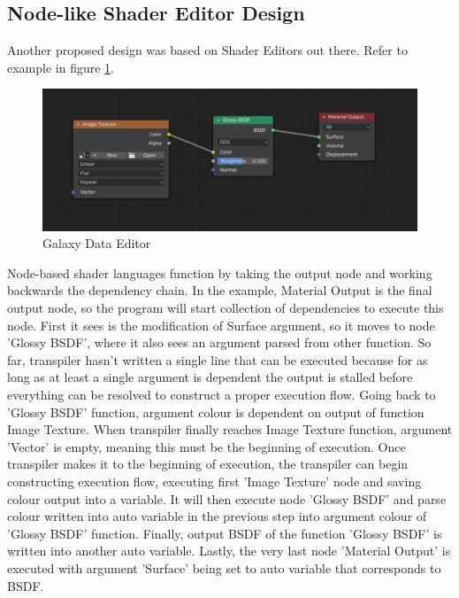 \documentclass{article}
\begin{document}
\subsection{Node-like Shader Editor Design}
Another proposed design was based on Shader Editors out there. Refer to example in figure \ref{fig:blendershader}. 
\begin{figure}[H]
    \centering
    \includegraphics[width=1\textwidth]{blendershaderNE.png}
    \caption{Galaxy Data Editor}
    \label{fig:blendershader}
\end{figure}
Node-based shader languages function by taking the output node and working backwards the dependency chain. In the example, Material Output is the final output node, so the program will start collection of dependencies to execute this node. First it sees is the modification of Surface argument, so it moves to node 'Glossy BSDF', where it also sees an argument parsed from other function. So far, transpiler hasn't written a single line that can be executed because for as long as at least a single argument is dependent the output is stalled before everything can be resolved to construct a proper execution flow. Going back to 'Glossy BSDF' function, argument colour is dependent on output of function Image Texture. When transpiler finally reaches Image Texture function, argument 'Vector' is empty, meaning this must be the beginning of execution. Once transpiler makes it to the beginning of execution, the transpiler can begin constructing execution flow, executing first 'Image Texture' node and saving colour output into a variable. It will then execute node 'Glossy BSDF' and parse colour written into auto variable in the previous step into argument colour of 'Glossy BSDF' function. Finally, output BSDF of the function 'Glossy BSDF' is written into another auto variable. Lastly, the very last node 'Material Output' is executed with argument 'Surface' being set to auto variable that corresponds to BSDF.
\end{document}
